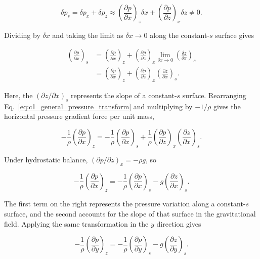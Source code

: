 \documentclass[10pt,twocolumn]{memoir}
\begin{document}
\begin{equation}
    \delta p_s = \delta p_x+\delta p_z \approx\left(\frac{\partial p}{\partial x}\right)_z\delta x + \left(\frac{\partial p}{\partial z}\right)_x\delta z \ne 0.
\end{equation}

Dividing by $\delta x$ and taking the limit as $\delta x\to0$ along the constant-$s$ surface gives

\begin{equation}
\begin{aligned}
    \left(\frac{\partial p}{\partial x}\right)_s
    &=\left(\frac{\partial p}{\partial x}\right)_z
    +\left(\frac{\partial p}{\partial z}\right)_x
    \lim_{\delta x\to0}\left(\frac{\delta z}{\delta x}\right)_s\\
    &=\left(\frac{\partial p}{\partial x}\right)_z
    +\left(\frac{\partial p}{\partial z}\right)_x
    \left(\frac{\partial z}{\partial x}\right)_s.
\end{aligned}
\label{eq:c1_general_pressure_transform}
\end{equation}

Here, the $(\partial z/\partial x)_s$ represents the slope of a constant-$s$ surface. Rearranging Eq.~\ref{eq:c1_general_pressure_transform} and multiplying by $-1/\rho$ gives the horizontal pressure gradient force per unit mass,

\begin{equation}
    -\frac{1}{\rho}\left(\frac{\partial p}{\partial x}\right)_z = -\frac{1}{\rho}\left(\frac{\partial p}{\partial x}\right)_s + \frac{1}{\rho}\left(\frac{\partial p}{\partial z}\right)_x \left(\frac{\partial z}{\partial x}\right)_s.
\end{equation}

Under hydrostatic balance, $(\partial p/\partial z)_x=-\rho g$, so

\begin{equation}
    -\frac{1}{\rho}\left(\frac{\partial p}{\partial x}\right)_z = -\frac{1}{\rho}\left(\frac{\partial p}{\partial x}\right)_s - g\left(\frac{\partial z}{\partial x}\right)_s.
\label{eq:c1_general_pgf_hydrostatic_x}
\end{equation}

The first term on the right represents the pressure variation along a constant-$s$ surface, and the second accounts for the slope of that surface in the gravitational field. Applying the same transformation in the $y$ direction gives

\begin{equation}
    -\frac{1}{\rho}\left(\frac{\partial p}{\partial y}\right)_z = -\frac{1}{\rho}\left(\frac{\partial p}{\partial y}\right)_s - g\left(\frac{\partial z}{\partial y}\right)_s.
\label{eq:c1_general_pgf_hydrostatic_y}
\end{equation}
\end{document}
